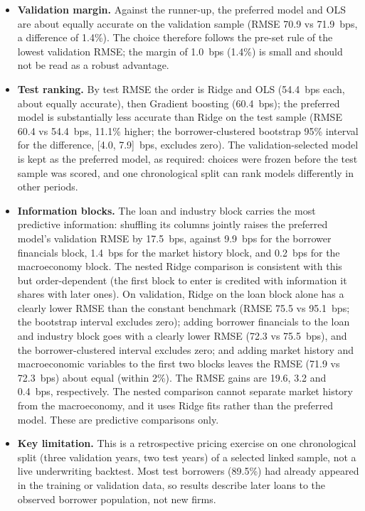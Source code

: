 \documentclass[9pt,letterpaper]{extarticle}
\begin{document}
\begin{itemize}
  \item \textbf{Validation margin.} Against the runner-up, the preferred model and OLS are about equally accurate on the validation sample (RMSE 70.9 vs 71.9~bps, a difference of 1.4\%). The choice therefore follows the pre-set rule of the lowest validation RMSE; the margin of 1.0~bps (1.4\%) is small and should not be read as a robust advantage.
  \item \textbf{Test ranking.} By test RMSE the order is Ridge and OLS (54.4~bps each, about equally accurate), then Gradient boosting (60.4~bps); the preferred model is substantially less accurate than Ridge on the test sample (RMSE 60.4 vs 54.4~bps, 11.1\% higher; the borrower-clustered bootstrap 95\% interval for the difference, [4.0, 7.9]~bps, excludes zero). The validation-selected model is kept as the preferred model, as required: choices were frozen before the test sample was scored, and one chronological split can rank models differently in other periods.
  \item \textbf{Information blocks.} The loan and industry block carries the most predictive information: shuffling its columns jointly raises the preferred model's validation RMSE by 17.5~bps, against 9.9~bps for the borrower financials block, 1.4~bps for the market history block, and 0.2~bps for the macroeconomy block. The nested Ridge comparison is consistent with this but order-dependent (the first block to enter is credited with information it shares with later ones). On validation, Ridge on the loan block alone has a clearly lower RMSE than the constant benchmark (RMSE 75.5 vs 95.1~bps; the bootstrap interval excludes zero); adding borrower financials to the loan and industry block goes with a clearly lower RMSE (72.3 vs 75.5~bps), and the borrower-clustered interval excludes zero; and adding market history and macroeconomic variables to the first two blocks leaves the RMSE (71.9 vs 72.3~bps) about equal (within 2\%). The RMSE gains are 19.6, 3.2 and 0.4~bps, respectively. The nested comparison cannot separate market history from the macroeconomy, and it uses Ridge fits rather than the preferred model. These are predictive comparisons only.
  \item \textbf{Key limitation.} This is a retrospective pricing exercise on one chronological split (three validation years, two test years) of a selected linked sample, not a live underwriting backtest. Most test borrowers (89.5\%) had already appeared in the training or validation data, so results describe later loans to the observed borrower population, not new firms.
\end{itemize}
\end{document}

